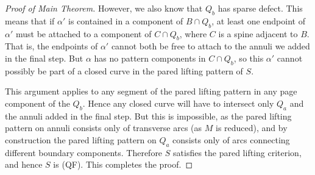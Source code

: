 \begin{proof}[Proof of Main Theorem]
However, we also know that $Q_b$ has sparse defect. This means that if
$\alpha'$ is contained in a component of $B \cap Q_b$, at least one endpoint of
$\alpha'$ must be attached to a component of $C \cap Q_b$, where $C$ is a spine
adjacent to $B$. That is, the endpoints of $\alpha'$ cannot both be free to
attach to the annuli we added in the final step. But $\alpha$ has no pattern
components in $C \cap Q_b$, so this $\alpha'$ cannot possibly be part of
a closed curve in the pared lifting pattern of $S$.

This argument applies to any segment of the pared lifting pattern in any page
component of the $Q_b$. Hence any closed curve will have to intersect only
$Q_a$ and the annuli added in the final step. But this is impossible, as the
pared lifting pattern on annuli consists only of transverse arcs (as $M$ is
reduced), and by construction the pared lifting pattern on $Q_a$ consists only
of arcs connecting different boundary components. Therefore $S$ satisfies the
pared lifting criterion, and hence $S$ is (QF). This completes the proof.

\end{proof}
